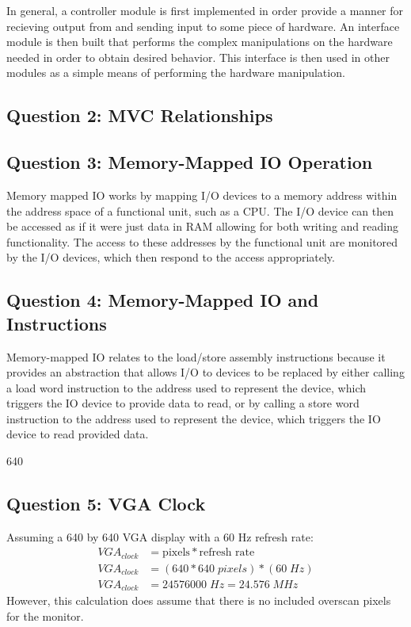 \documentclass[letterpaper]{article} %
\begin{document}
        In general, a controller module is first implemented in order provide a manner for recieving output from and sending input to some piece of hardware. An interface module is then built that performs the complex manipulations on the hardware needed in order to obtain desired behavior. This interface is then used in other modules as a simple means of performing the hardware manipulation.
    
    \subsection{Question 2: MVC Relationships} 
        
    \subsection{Question 3: Memory-Mapped IO Operation}
        Memory mapped IO works by mapping I/O devices to a memory address within the address space of a functional unit, such as a CPU. The I/O device can then be accessed as if it were just data in RAM allowing for both writing and reading functionality. The access to these addresses by the functional unit are monitored by the I/O devices, which then respond to the access appropriately.
    
    \subsection{Question 4: Memory-Mapped IO and Instructions}
        Memory-mapped IO relates to the load/store assembly instructions because it provides an abstraction that allows I/O to devices to be replaced by either calling a load word instruction to the address used to represent the device, which triggers the IO device to provide data to read, or by calling a store word instruction to the address used to represent the device, which triggers the IO device to read provided data. 
        
        640
    \subsection{Question 5: VGA Clock}
        Assuming a 640 by 640 VGA display with a 60 Hz refresh rate:
        \begin{align*}
            VGA_{clock} &= \text{pixels} * \text{refresh rate} \\
            VGA_{clock} &= (640 * 640\; pixels) * (60\; Hz) \\
            VGA_{clock} &= 24576000\; Hz = 24.576\; MHz
        \end{align*}
        However, this calculation does assume that there is no included overscan pixels for the monitor. 
\end{document}
